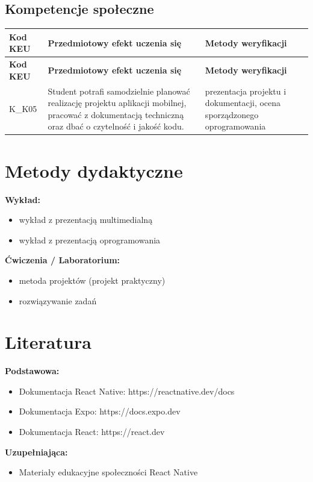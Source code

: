 \documentclass[12pt, a4paper]{article}
\newcommand{\thdrule}{\noalign{\global\setlength{\extrarowheight}{0pt}}}
\newcommand{\thdend}{\noalign{\global\setlength{\extrarowheight}{3pt}}}
\begin{document}
\subsection*{Kompetencje społeczne}
{\scriptsize
\begin{longtable}{m{1.6cm}m{9.0cm}m{4.2cm}}
\thdrule\toprule
\rowcolor{pjatkRed} {\color{white}\footnotesize\textbf{\vphantom{Ag}Kod KEU}} & {\color{white}\footnotesize\textbf{\vphantom{Ag}Przedmiotowy efekt uczenia się}} & {\color{white}\footnotesize\textbf{\vphantom{Ag}Metody weryfikacji}} \\
\midrule\thdend
\endfirsthead
\thdrule\toprule
\rowcolor{pjatkRed} {\color{white}\footnotesize\textbf{\vphantom{Ag}Kod KEU}} & {\color{white}\footnotesize\textbf{\vphantom{Ag}Przedmiotowy efekt uczenia się}} & {\color{white}\footnotesize\textbf{\vphantom{Ag}Metody weryfikacji}} \\
\midrule\thdend
\endhead
  \rowcolor{tableRowLight} K\_K05 & Student potrafi samodzielnie planować realizację projektu aplikacji mobilnej, pracować z dokumentacją techniczną oraz dbać o czytelność i jakość kodu. & prezentacja projektu i dokumentacji, ocena sporządzonego oprogramowania \\
\bottomrule
\end{longtable}}

\section{Metody dydaktyczne}

\textbf{Wykład:}
\begin{itemize}
  \item wykład z prezentacją multimedialną
  \item wykład z prezentacją oprogramowania
\end{itemize}
\vspace{4pt}
\textbf{Ćwiczenia / Laboratorium:}
\begin{itemize}
  \item metoda projektów (projekt praktyczny)
  \item rozwiązywanie zadań
\end{itemize}
\vspace{4pt}


\section{Literatura}

\textbf{Podstawowa:}
\begin{itemize}
  \item Dokumentacja React Native: https://reactnative.dev/docs
  \item Dokumentacja Expo: https://docs.expo.dev
  \item Dokumentacja React: https://react.dev
\end{itemize}

\textbf{Uzupełniająca:}
\begin{itemize}
  \item Materiały edukacyjne społeczności React Native
\end{itemize}
\end{document}
